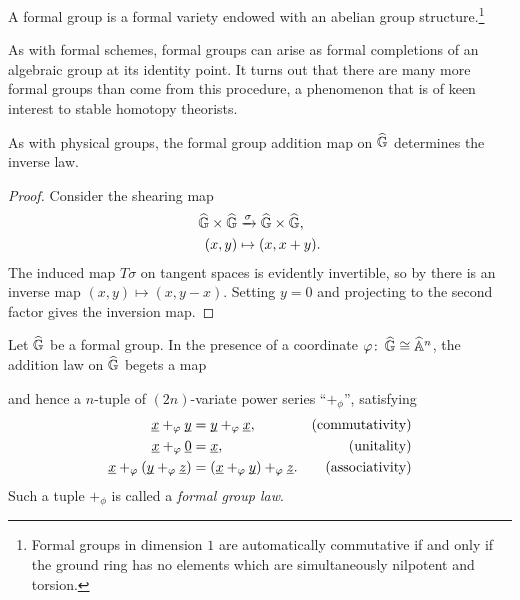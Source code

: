 \begin{definition}
A formal group is a formal variety endowed with an abelian group structure.\footnote{Formal groups in dimension $1$ are automatically commutative if and only if the ground ring has no elements which are simultaneously nilpotent and torsion.}
\end{definition}

\begin{remark}
As with formal schemes, formal groups can arise as formal completions of an algebraic group at its identity point.  It turns out that there are many more formal groups than come from this procedure, a phenomenon that is of keen interest to stable homotopy theorists.
\end{remark}

\begin{corollary}
As with physical groups, the formal group addition map on $\G$ determines the inverse law.
\end{corollary}
\begin{proof}
Consider the shearing map
\begin{align*}
\G \times \G & \xrightarrow{\sigma} \G \times \G, \\
(x, y) & \mapsto (x, x + y).
\end{align*}
The induced map $T\sigma$ on tangent spaces is evidently invertible, so by  there is an inverse map $(x, y) \mapsto (x, y - x)$.  Setting $y = 0$ and projecting to the second factor gives the inversion map.
\end{proof}

\begin{definition}\label{FGLDefinition}
Let $\G$ be a formal group.  In the presence of a coordinate $\phi \co \G \cong \A^n$, the addition law on $\G$ begets a map
\begin{center}
 
\end{center}
and hence a $n$-tuple of $(2n)$-variate power series ``$+_\phi$'', satisfying
\begin{align*}
\underline{\smash x} +_\phi \underline{\smash y} & = \underline{\smash y} +_\phi \underline{\smash x}, & \text{(commutativity)} \\
\underline{\smash x} +_\phi \underline{\smash 0} & = \underline{\smash x}, & \text{(unitality)} \\
\underline{\smash x} +_\phi (\underline{\smash y} +_\phi \underline{\smash z}) & = (\underline{\smash x} +_\phi \underline{\smash y}) +_\phi \underline{\smash z}. & \text{(associativity)}
\end{align*}
Such a tuple $+_\phi$ is called a \textit{formal group law}.
\end{definition}

